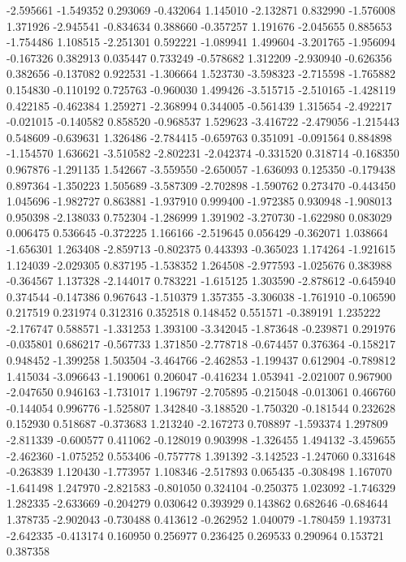 -2.595661
-1.549352
0.293069
-0.432064
1.145010
-2.132871
0.832990
-1.576008
1.371926
-2.945541
-0.834634
0.388660
-0.357257
1.191676
-2.045655
0.885653
-1.754486
1.108515
-2.251301
0.592221
-1.089941
1.499604
-3.201765
-1.956094
-0.167326
0.382913
0.035447
0.733249
-0.578682
1.312209
-2.930940
-0.626356
0.382656
-0.137082
0.922531
-1.306664
1.523730
-3.598323
-2.715598
-1.765882
0.154830
-0.110192
0.725763
-0.960030
1.499426
-3.515715
-2.510165
-1.428119
0.422185
-0.462384
1.259271
-2.368994
0.344005
-0.561439
1.315654
-2.492217
-0.021015
-0.140582
0.858520
-0.968537
1.529623
-3.416722
-2.479056
-1.215443
0.548609
-0.639631
1.326486
-2.784415
-0.659763
0.351091
-0.091564
0.884898
-1.154570
1.636621
-3.510582
-2.802231
-2.042374
-0.331520
0.318714
-0.168350
0.967876
-1.291135
1.542667
-3.559550
-2.650057
-1.636093
0.125350
-0.179438
0.897364
-1.350223
1.505689
-3.587309
-2.702898
-1.590762
0.273470
-0.443450
1.045696
-1.982727
0.863881
-1.937910
0.999400
-1.972385
0.930948
-1.908013
0.950398
-2.138033
0.752304
-1.286999
1.391902
-3.270730
-1.622980
0.083029
0.006475
0.536645
-0.372225
1.166166
-2.519645
0.056429
-0.362071
1.038664
-1.656301
1.263408
-2.859713
-0.802375
0.443393
-0.365023
1.174264
-1.921615
1.124039
-2.029305
0.837195
-1.538352
1.264508
-2.977593
-1.025676
0.383988
-0.364567
1.137328
-2.144017
0.783221
-1.615125
1.303590
-2.878612
-0.645940
0.374544
-0.147386
0.967643
-1.510379
1.357355
-3.306038
-1.761910
-0.106590
0.217519
0.231974
0.312316
0.352518
0.148452
0.551571
-0.389191
1.235222
-2.176747
0.588571
-1.331253
1.393100
-3.342045
-1.873648
-0.239871
0.291976
-0.035801
0.686217
-0.567733
1.371850
-2.778718
-0.674457
0.376364
-0.158217
0.948452
-1.399258
1.503504
-3.464766
-2.462853
-1.199437
0.612904
-0.789812
1.415034
-3.096643
-1.190061
0.206047
-0.416234
1.053941
-2.021007
0.967900
-2.047650
0.946163
-1.731017
1.196797
-2.705895
-0.215048
-0.013061
0.466760
-0.144054
0.996776
-1.525807
1.342840
-3.188520
-1.750320
-0.181544
0.232628
0.152930
0.518687
-0.373683
1.213240
-2.167273
0.708897
-1.593374
1.297809
-2.811339
-0.600577
0.411062
-0.128019
0.903998
-1.326455
1.494132
-3.459655
-2.462360
-1.075252
0.553406
-0.757778
1.391392
-3.142523
-1.247060
0.331648
-0.263839
1.120430
-1.773957
1.108346
-2.517893
0.065435
-0.308498
1.167070
-1.641498
1.247970
-2.821583
-0.801050
0.324104
-0.250375
1.023092
-1.746329
1.282335
-2.633669
-0.204279
0.030642
0.393929
0.143862
0.682646
-0.684644
1.378735
-2.902043
-0.730488
0.413612
-0.262952
1.040079
-1.780459
1.193731
-2.642335
-0.413174
0.160950
0.256977
0.236425
0.269533
0.290964
0.153721
0.387358
